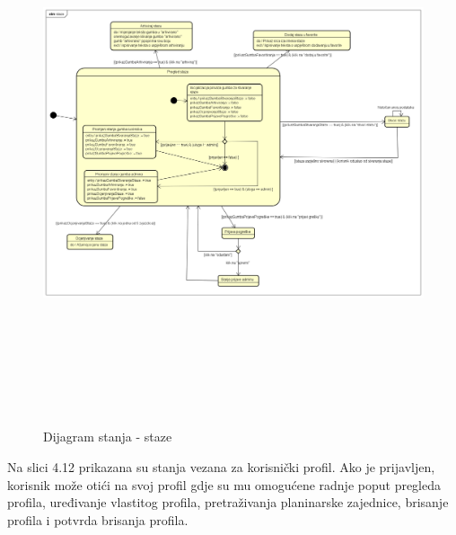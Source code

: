 		    \begin{figure}[H]
		    	\includegraphics[width=160mm, height=160mm]{dijagrami/sd-autentikacija/staze.png} %
		    	\centering
		    	\caption{Dijagram stanja - staze}
		    	\label{fig:dijagrami_stanja3}
		    \end{figure}
			
			\newpage
			Na slici 4.12 prikazana su stanja vezana za korisnički profil. Ako je prijavljen, korisnik može otići na svoj profil gdje su mu omogućene radnje poput pregleda profila, uređivanje vlastitog profila, pretraživanja planinarske zajednice, brisanje profila i potvrda brisanja profila.
			
